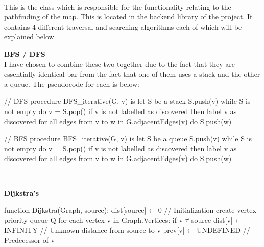 \begin{FlushLeft}
    \begin{figure}[H]
        \centering
    \end{figure}\\

    This is the class which is responsible for the functionality relating to the pathfinding of the map. This is located in the backend library of the project. It contains 4 different traversal and searching algorithms each of which will be explained below. \\ \bk

    \textbf{BFS / DFS} \\
    I have chosen to combine these two together due to the fact that they are essentially identical bar from the fact that one of them uses a stack and the other a queue. The pseudocode for each is below:\\
    \begin{pseudocode}
// DFS
procedure DFS_iterative(G, v) is
let S be a stack
S.push(v)
while S is not empty do
    v = S.pop()
    if v is not labelled as discovered then
        label v as discovered
        for all edges from v to w in G.adjacentEdges(v) do 
            S.push(w)

// BFS
procedure BFS_iterative(G, v) is
let S be a queue
S.push(v)
while S is not empty do
    v = S.pop()
    if v is not labelled as discovered then
        label v as discovered
        for all edges from v to w in G.adjacentEdges(v) do 
            S.push(w)
    \end{pseudocode} \\ \BK

    \textbf{Dijkstra's} \\
    \begin{pseudocode}
function Dijkstra(Graph, source):
    dist[source] ← 0                           // Initialization
    create vertex priority queue Q
    for each vertex v in Graph.Vertices:
        if v ≠ source
            dist[v] ← INFINITY                 // Unknown distance from source to v
            prev[v] ← UNDEFINED                // Predecessor of v


\end{pseudocode}
\end{FlushLeft}
